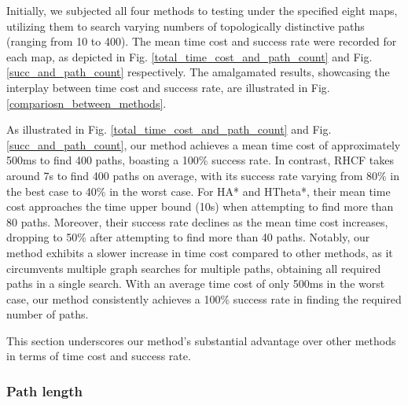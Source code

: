 \documentclass[lettersize,journal]{IEEEtran}
\begin{document}

Initially, we subjected all four methods to testing under the specified eight maps, utilizing them to search varying numbers of topologically distinctive paths (ranging from 10 to 400). The mean time cost and success rate were recorded for each map, as depicted in Fig. \ref{total_time_cost_and_path_count} and Fig. \ref{succ_and_path_count} respectively. The amalgamated results, showcasing the interplay between time cost and success rate, are illustrated in Fig. \ref{compariosn_between_methods}.

As illustrated in Fig. \ref{total_time_cost_and_path_count} and Fig. \ref{succ_and_path_count}, our method achieves a mean time cost of approximately 500ms to find 400 paths, boasting a 100\% success rate. In contrast, RHCF takes around 7s to find 400 paths on average, with its success rate varying from 80\% in the best case to 40\% in the worst case. For HA* and HTheta*, their mean time cost approaches the time upper bound (10s) when attempting to find more than 80 paths. Moreover, their success rate declines as the mean time cost increases, dropping to 50\% after attempting to find more than 40 paths. Notably, our method exhibits a slower increase in time cost compared to other methods, as it circumvents multiple graph searches for multiple paths, obtaining all required paths in a single search. With an average time cost of only 500ms in the worst case, our method consistently achieves a 100\% success rate in finding the required number of paths.

This section underscores our method's substantial advantage over other methods in terms of time cost and success rate.

\subsubsection{Path length}
\end{document}
